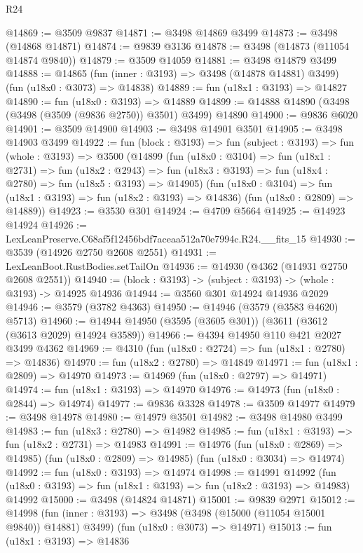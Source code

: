 \begin{lexlean}{R24}
\begin{coremodule}
@14869 := @3509 @9837
@14871 := @3498 @14869 @3499
@14873 := @3498 (@14868 @14871)
@14874 := @9839 @3136
@14878 := @3498 (@14873 (@11054 @14874 @9840))
@14879 := @3509 @14059
@14881 := @3498 @14879 @3499
@14888 := @14865
    (fun (inner : @3193) => @3498 (@14878 @14881) @3499)
    (fun (u18x0 : @3073) => @14838)
@14889 := fun (u18x1 : @3193) => @14827
@14890 := fun (u18x0 : @3193) => @14889
@14899 := @14888 @14890 (@3498 (@3498 (@3509 (@9836 @2750)) @3501) @3499) @14890
@14900 := @9836 @6020
@14901 := @3509 @14900
@14903 := @3498 @14901 @3501
@14905 := @3498 @14903 @3499
@14922 := fun (block : @3193) =>
  fun (subject : @3193) =>
  fun (whole : @3193) =>
  @3500
    (@14899
      (fun (u18x0 : @3104) =>
      fun (u18x1 : @2731) =>
      fun (u18x2 : @2943) =>
      fun (u18x3 : @3193) => fun (u18x4 : @2780) => fun (u18x5 : @3193) => @14905)
      (fun (u18x0 : @3104) => fun (u18x1 : @3193) => fun (u18x2 : @3193) => @14836)
      (fun (u18x0 : @2809) => @14889))
@14923 := @3530 @301
@14924 := @4709 @5664
@14925 := @14923 @14924
@14926 := LexLeanPreserve.C68af5f12456bdf7aceaa512a70e7994c.R24.__fits_15
@14930 := @3539 (@14926 @2750 @2608 @2551)
@14931 := LexLeanBoot.RustBodies.setTailOn
@14936 := @14930 (@4362 (@14931 @2750 @2608 @2551))
@14940 := (block : @3193) -> (subject : @3193) -> (whole : @3193) -> @14925 @14936
@14944 := @3560 @301 @14924 @14936 @2029
@14946 := @3579 (@3782 @4363)
@14950 := @14946 (@3579 (@3583 @4620) @5713)
@14960 := @14944 @14950 (@3595 (@3605 @301)) (@3611 (@3612 (@3613 @2029) @14924 @3589))
@14966 := @4394 @14950 @110 @421 @2027 @3499 @4362
@14969 := @4310 (fun (u18x0 : @2724) => fun (u18x1 : @2780) => @14836)
@14970 := fun (u18x2 : @2780) => @14849
@14971 := fun (u18x1 : @2809) => @14970
@14973 := @14969 (fun (u18x0 : @2797) => @14971)
@14974 := fun (u18x1 : @3193) => @14970
@14976 := @14973 (fun (u18x0 : @2844) => @14974)
@14977 := @9836 @3328
@14978 := @3509 @14977
@14979 := @3498 @14978
@14980 := @14979 @3501
@14982 := @3498 @14980 @3499
@14983 := fun (u18x3 : @2780) => @14982
@14985 := fun (u18x1 : @3193) => fun (u18x2 : @2731) => @14983
@14991 := @14976
    (fun (u18x0 : @2869) => @14985)
    (fun (u18x0 : @2809) => @14985)
    (fun (u18x0 : @3034) => @14974)
@14992 := fun (u18x0 : @3193) => @14974
@14998 := @14991
    @14992
    (fun (u18x0 : @3193) => fun (u18x1 : @3193) => fun (u18x2 : @3193) => @14983)
    @14992
@15000 := @3498 (@14824 @14871)
@15001 := @9839 @2971
@15012 := @14998
    (fun (inner : @3193) => @3498 (@3498 (@15000 (@11054 @15001 @9840)) @14881) @3499)
    (fun (u18x0 : @3073) => @14971)
@15013 := fun (u18x1 : @3193) => @14836

\end{coremodule}
\end{lexlean}
